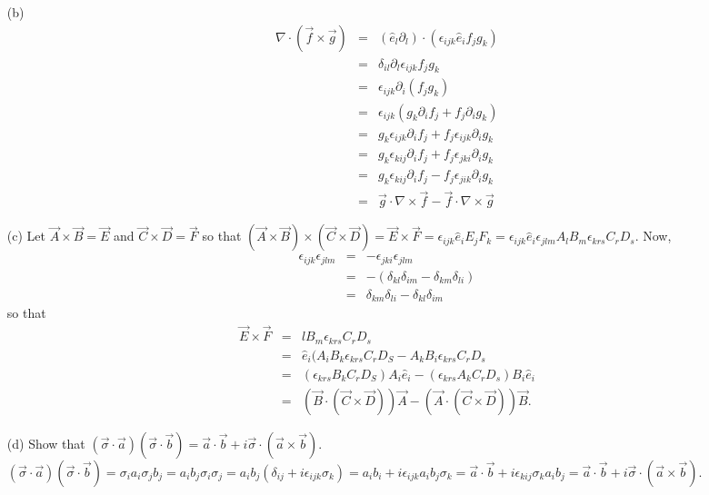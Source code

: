 \documentclass{article}
\begin{document}
\begin{enumerate}
\begin{enumerate}
\item[(b)] \begin{eqnarray*}
\nabla\cdot(\vec{f}\times\vec{g}) &=& (\hat{e}_l\partial_l)
\cdot(\epsilon_{ijk}\hat{e}_if_jg_k) \\
 &=& \delta_{il}\partial_l\epsilon_{ijk}f_jg_k \\
 &=& \epsilon_{ijk}\partial_i(f_jg_k) \\
 &=& \epsilon_{ijk}(g_k\partial_if_j + f_j\partial_ig_k) \\
 &=& g_k\epsilon_{ijk}\partial_if_j + f_j\epsilon_{ijk}\partial_i g_k \\
 &=& g_k\epsilon_{kij}\partial_i f_j + f_j\epsilon_{jki}\partial_i g_k \\
 &=& g_k\epsilon_{kij}\partial_if_j - f_j\epsilon_{jik}\partial_i g_k \\
 &=&\vec{g}\cdot\nabla\times\vec{f} - \vec{f}\cdot\nabla\times\vec{g}
\end{eqnarray*}

\item[(c)] Let $\vec{A} \times \vec{B} = \vec{E}$ and $\vec{C} \times 
\vec{D} = \vec{F}$ so that  $(\vec{A} \times \vec{B}) \times (\vec{C} 
\times \vec{D}) = \vec{E} \times \vec{F} = \epsilon_{ijk}\hat{e}_iE_jF_k
= \epsilon_{ijk}\hat{e}_i\epsilon_{jlm}A_lB_m\epsilon_{krs}C_rD_s$. Now,
\begin{eqnarray*}
\epsilon_{ijk}\epsilon_{jlm} &=& -\epsilon_{jki}\epsilon_{jlm} \\
 &=& -(\delta_{kl}\delta_{im} - \delta_{km}\delta_{li}) \\
 &=& \delta_{km}\delta_{li} - \delta_{kl}\delta_{im}
\end{eqnarray*}
so that 
\begin{eqnarray*}
\vec{E} \times \vec{F} &=& lB_m\epsilon_{krs}C_rD_s \\
 &=& \hat{e}_i(A_iB_k\epsilon_{krs}C_rD_S - A_kB_i\epsilon_{krs}C_rD_s\\
 &=& (\epsilon_{krs}B_kC_rD_S)A_i\hat{e}_i - 
     (\epsilon_{krs}A_kC_rD_s)B_i\hat{e}_i \\
 &=& (\vec{B}\cdot(\vec{C} \times \vec{D}))\vec{A} - 
     (\vec{A}\cdot(\vec{C} \times \vec{D}))\vec{B}.
\end{eqnarray*}

\item[(d)] Show that $(\vec{\sigma}\cdot\vec{a})(\vec{\sigma}\cdot\vec{b}) = 
\vec{a}\cdot\vec{b} + i\vec{\sigma}\cdot(\vec{a}\times\vec{b})$.
$(\vec{\sigma}\cdot\vec{a})(\vec{\sigma}\cdot\vec{b}) = \sigma_i a_i \sigma_jb_j
= a_ib_j\sigma_i\sigma_j = a_ib_j(\delta_{ij} + i\epsilon_{ijk}\sigma_k)
= a_ib_i + i\epsilon_{ijk}a_ib_j\sigma_k = \vec{a}\cdot\vec{b} + i\epsilon_{kij}
\sigma_ka_ib_j = \vec{a}\cdot\vec{b} + i\vec{\sigma}\cdot(\vec{a}\times\vec{b})$.
\end{enumerate}


\end{enumerate}
\end{document}
